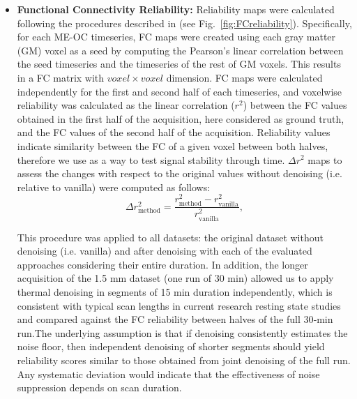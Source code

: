 \begin{itemize}
and

\begin{equation}
\Delta S_{0,\mathrm{method}} = \frac{S_{0,\mathrm{method}} - S_{0,\mathrm{method}}}{S_{0,\mathrm{vanilla}}}.
\end{equation}

In addition, we also computed the deviation of the instantaneous relaxation rate estimates from its average value, i.e. , $\Delta R_2^*(t) = R_2^*(t) - \overline{R_2^*}$, expressed in units of s$^{-1}$. We assumed that physiologically driven fluctuations in relaxation rate occur within a range of approximately $|1 \text{ s}^{-1}|$ \citep{vanderzwaagFMRI1532009, caballerogaudesParadigmFreeMapping2011}; thus, we examined how thermal denoising influenced the physiological plausibility of instantaneous $\Delta R_2^*$ signal changes (see Fig.~\ref{fig:plausabilityR2}).



\item\textbf{Functional Connectivity Reliability:} Reliability maps were calculated following the procedures described in \citet{lynchRapidPrecisionFunctional2020} (see Fig.~\ref{fig:FCreliability}). Specifically, for each ME-OC timeseries, FC maps were created using each gray matter (GM) voxel as a seed by computing  the Pearson's linear correlation between the seed timeseries and the timeseries of the rest of GM voxels. This results in a FC matrix with $voxel\times voxel$ dimension. FC maps were calculated independently for the first and second half of each timeseries, and voxelwise reliability was calculated as the linear correlation ($r^{2}$) between the FC values obtained in the first half of the acquisition, here considered as ground truth, and the FC values of the second half of the acquisition. Reliability values indicate similarity between the FC of a given voxel between both halves, therefore we use as a way to test signal stability through time. $\Delta r^2$ maps to assess the changes with respect to the original values without denoising (i.e. relative to vanilla) were computed as follows:
\begin{equation}
\Delta   r^2_\mathrm{method}= \frac{  r^2_\mathrm{method} -  r^2_\mathrm{vanilla}}{ r^2_\mathrm{vanilla}}, 
\end{equation}

This procedure was applied to all datasets: the original dataset without denoising (i.e. vanilla) and after denoising with each of the evaluated approaches considering their entire duration. In addition, the longer acquisition of the 1.5 mm dataset (one run of 30 min) allowed us to apply thermal denoising in segments of 15 min duration independently, which is consistent with typical scan lengths in current research resting state studies and compared against the FC reliability between halves of the full 30‑min run.The underlying assumption is that if denoising consistently estimates the noise floor, then independent denoising of shorter segments should yield reliability scores similar to those obtained from joint denoising of the full run. Any systematic deviation would indicate that the effectiveness of noise suppression depends on scan duration.


\end{itemize}

